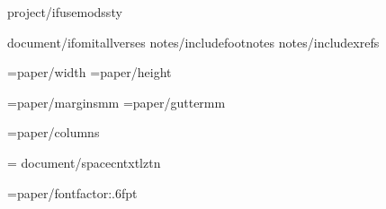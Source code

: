 



{project/ifusemodssty} %

{document/ifomitallverses}
{notes/includefootnotes}
{notes/includexrefs}

\PaperWidth={paper/width}
\PaperHeight={paper/height}

\MarginUnit={paper/margins}mm
\def\TopMarginFactor{{{paper/topmarginfactor}}}
\def\BottomMarginFactor{{{paper/bottommarginfactor}}}
\def\SideMarginFactor{{{paper/sidemarginfactor}}}
\BindingGutter={paper/gutter}mm

\BodyColumns={paper/columns}
\def\ColumnGutterFactor{{{document/colgutterfactor}}}

\def\LineSpacingFactor{{{paragraph/linespacing}}}
\def\VerticalSpaceFactor{{1.0}}

\XeTeXinterwordspaceshaping = {document/spacecntxtlztn}

\FontSizeUnit={paper/fontfactor:.6f}pt   %

\def\regular{{"{fontregular/name}:{document/script}{document/digitmapping}"}}
\def\bold{{"{fontbold/name}:{document/script}{document/digitmapping}{fontbold/embolden}{fontbold/slant}"}}
\def\italic{{"{fontitalic/name}:{document/script}{document/digitmapping}{fontitalic/embolden}{fontitalic/slant}"}}
\def\bolditalic{{"{fontbolditalic/name}:{document/script}{document/digitmapping}{fontbolditalic/embolden}{fontbolditalic/slant}"}}

